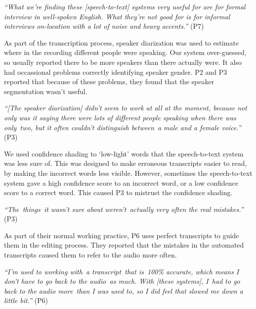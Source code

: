 \textit{``What we're finding these [speech-to-text] systems very useful for are for formal interview in well-spoken
English. What they're not good for is for informal interviews on-location with a lot of noise and heavy accents.''}
(P7)

As part of the transcription process, speaker diarization was used to estimate where in the recording different people
were speaking.  Our system over-guessed, so usually reported there to be more speakers than there actually were. It
also had occassional problems correctly identifying speaker gender. P2 and P3 reported that because of these problems,
they found that the speaker segmentation wasn't useful.

\textit{``[The speaker diarization] didn't seem to work at all at the moment, because not only was it saying there were
lots of different people speaking when there was only two, but it often couldn't distinguish between a male and a
female voice.''} (P3)

We used confidence shading to `low-light' words that the speech-to-text system was less sure of. This was designed to
make erroneous transcripts easier to read, by making the incorrect words less visible.  However, sometimes the
speech-to-text system gave a high confidence score to an incorrect word, or a low confidence score to a correct word.
This caused P3 to mistrust the confidence shading.

\textit{``The things it wasn't sure about weren't actually very often the real mistakes.''} (P3)



As part of their normal working practice, P6 uses perfect transcripts to guide them in the editing process. They
reported that the mistakes in the automated transcripts caused them to refer to the audio more often.

\textit{``I'm used to working with a transcript that is 100\% accurate, which means I don't have to go back to the
audio as much. With [these systems], I had to go back to the audio more than I was used to, so I did feel that slowed
me down a little bit.''} (P6)

